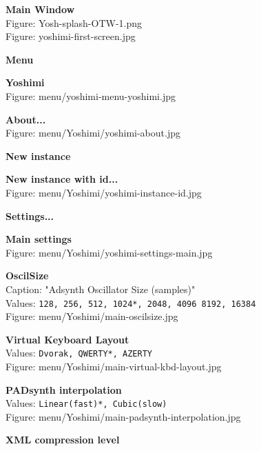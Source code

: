 \documentclass[
 11pt,
 twoside,
 a4paper,
 headinclude,
 footinclude,
 final                                 %
]{article}
\begin{document}
\begin{enumber}

   \item \textbf{Main Window} \\
      Figure: Yosh-splash-OTW-1.png \\
      Figure: yoshimi-first-screen.jpg
   \item \textbf{Menu}
   \begin{enumber}                     %
      \item \textbf{Yoshimi} \\
         Figure: menu/yoshimi-menu-yoshimi.jpg
      \begin{enumber}
         \item \textbf{About...} \\
            Figure: menu/Yoshimi/yoshimi-about.jpg
         \item \textbf{New instance}
         \item \textbf{New instance with id...} \\
            Figure: menu/Yoshimi/yoshimi-instance-id.jpg
         \item \textbf{Settings...}
         \begin{enumber}
            \item \textbf{Main settings} \\
               Figure: menu/Yoshimi/yoshimi-settings-main.jpg
            \begin{enumber}
               \item \textbf{OscilSize} \\
                  Caption: "Adsynth Oscillator Size (samples)" \\
                  Values: \texttt{128, 256, 512, 1024*, 2048, 4096 8192, 16384} \\
                  Figure: menu/Yoshimi/main-oscilsize.jpg
               \item \textbf{Virtual Keyboard Layout} \\
                  Values: \texttt{Dvorak, QWERTY*, AZERTY} \\
                  Figure: menu/Yoshimi/main-virtual-kbd-layout.jpg
               \item \textbf{PADsynth interpolation} \\
                  Values: \texttt{Linear(fast)*, Cubic(slow)} \\
                  Figure: menu/Yoshimi/main-padsynth-interpolation.jpg
               \item \textbf{XML compression level} \\

\end{enumber}
\end{enumber}
\end{enumber}
\end{enumber}
\end{enumber}
\end{document}
